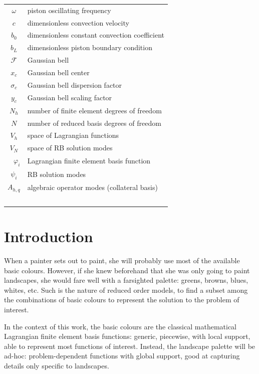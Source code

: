 \documentclass[thesis.tex]{subfiles}
\begin{document}
\begin{table}[h]
\begin{tabular}{cl}
        $\omega$ & piston oscillating frequency  \\
        $c$ & dimensionless convection velocity \\
        $b_0$ & dimensionless constant convection coefficient \\
        $b_L$ & dimensionless piston boundary condition \\
        $\mathcal{F}$ & Gaussian bell \\
        $x_c$ & Gaussian bell center \\
        $\sigma_c$ & Gaussian bell dispersion factor \\
        $y_c$ & Gaussian bell scaling factor \\
        $N_h$ & number of finite element degrees of freedom \\ 
        $N$ & number of reduced basis degrees of freedom \\ 
        $V_h$ & space of Lagrangian functions\\ 
        $V_N$ & space of RB solution modes\\ 
        $\varphi_i$ & Lagrangian finite element basis function \\ 
        $\psi_i$ & RB solution modes \\
        $A_{h,q}$ & algebraic operator modes (collateral basis)\\ 
    \end{tabular}
\end{table}

\newpage 
\section{Introduction}
When a painter sets out to paint, she will probably use most of the available basic colours.
However, if she knew beforehand that she was only going to paint landscapes, 
she would fare well with a farsighted palette: greens, browns, blues, whites, etc.
Such is the nature of reduced order models, 
to find a subset among the combinations of basic colours 
to represent the solution to the problem of interest.

In the context of this work, 
the basic colours are the classical mathematical Lagrangian finite element basis functions: 
generic, piecewise, with local support, able to represent most functions of interest.
Instead, the landscape palette will be ad-hoc:
problem-dependent functions with global support, 
good at capturing details only specific to landscapes.
\end{document}
